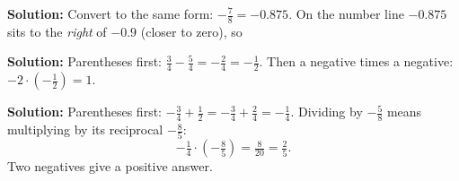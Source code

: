 \documentclass[12pt]{article}
\begin{document}

\textbf{Solution:} Convert to the same form: $-\tfrac{7}{8} = -0.875$. On the number
line $-0.875$ sits to the \emph{right} of $-0.9$ (closer to zero), so


\textbf{Solution:} Parentheses first: $\tfrac{3}{4} - \tfrac{5}{4} = -\tfrac{2}{4} = -\tfrac{1}{2}$.
Then a negative times a negative: $-2 \cdot \left(-\tfrac{1}{2}\right) = 1$. 


\textbf{Solution:} Parentheses first: $-\tfrac{3}{4} + \tfrac{1}{2} = -\tfrac{3}{4} + \tfrac{2}{4} = -\tfrac{1}{4}$.
Dividing by $-\tfrac{5}{8}$ means multiplying by its reciprocal $-\tfrac{8}{5}$:
\[ -\tfrac{1}{4} \cdot \left(-\tfrac{8}{5}\right) = \tfrac{8}{20} = \tfrac{2}{5}. \]
Two negatives give a positive answer. 
\end{document}
